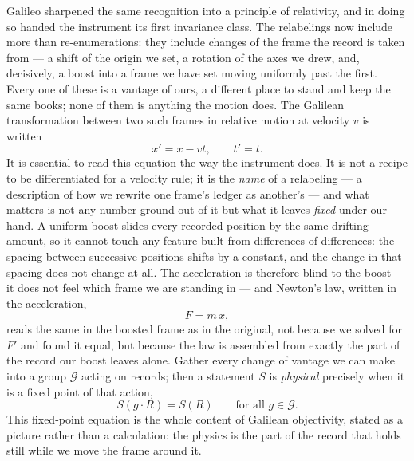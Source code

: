 Galileo sharpened the same recognition into a principle of relativity, and in doing so handed the instrument
its first invariance class. The relabelings now include more than re-enumerations: they include changes of the
frame the record is taken from --- a shift of the origin we set, a rotation of the axes we drew, and,
decisively, a boost into a frame we have set moving uniformly past the first. Every one of these is a vantage
of ours, a different place to stand and keep the same books; none of them is anything the motion does. The
Galilean transformation between two such frames in relative motion at velocity $v$ is written
\begin{equation}
  x' = x - v t, \qquad t' = t .
\end{equation}
It is essential to read this equation the way the instrument does. It is not a recipe to be differentiated
for a velocity rule; it is the \emph{name} of a relabeling --- a description of how we rewrite one frame's
ledger as another's --- and what matters is not any number ground out of it but what it leaves \emph{fixed}
under our hand. A uniform boost slides every recorded position by the same drifting amount, so it cannot touch
any feature built from differences of differences: the spacing between successive positions shifts by a
constant, and the change in that spacing does not change at all. The acceleration is therefore blind to the
boost --- it does not feel which frame we are standing in --- and Newton's law, written in the acceleration,
\begin{equation}
  F = m\,\ddot{x},
\end{equation}
reads the same in the boosted frame as in the original, not because we solved for $F'$ and found it equal, but
because the law is assembled from exactly the part of the record our boost leaves alone. Gather every change of
vantage we can make into a group $\mathcal{G}$ acting on records; then a statement $S$ is \emph{physical}
precisely when it is a fixed point of that action,
\begin{equation}
  S(g \cdot R) = S(R) \qquad \text{for all } g \in \mathcal{G}.
\end{equation}
This fixed-point equation is the whole content of Galilean objectivity, stated as a picture rather than a
calculation: the physics is the part of the record that holds still while we move the frame around it.

